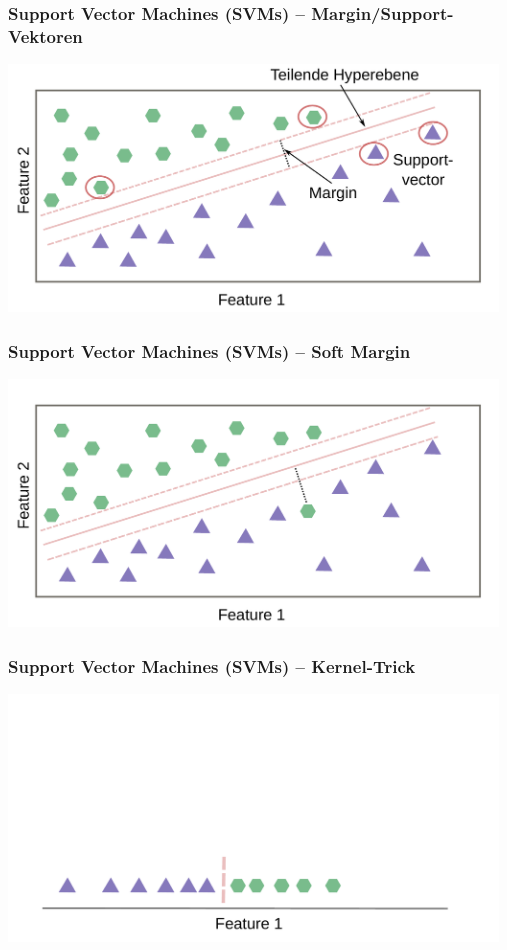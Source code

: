 \documentclass[aspectratio=169]{beamer}
\begin{document}
\begin{frame}
  \frametitle{Support Vector Machines (SVMs) -- Margin/Support-Vektoren}
  \begin{center}
    \includegraphics[width=13.0cm]{images/svm_with_margin.pdf}
  \end{center}
\end{frame}

\begin{frame}
  \frametitle{Support Vector Machines (SVMs) -- Soft Margin}
  \begin{center}
    \includegraphics[width=13.0cm]{images/svm_with_soft_margin.pdf}
  \end{center}
\end{frame}

\begin{frame}
  \frametitle{Support Vector Machines (SVMs) -- Kernel-Trick}
  \begin{center}
    \includegraphics[width=13.0cm]{images/svm_kernel_trick_1.pdf}
  \end{center}
\end{frame}
\end{document}
